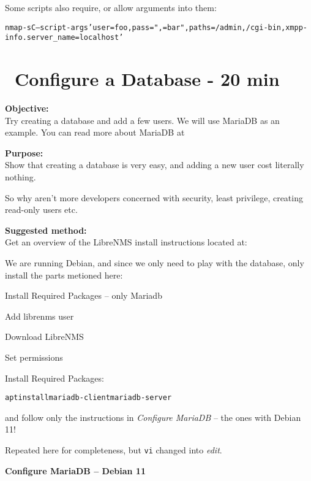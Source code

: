 \documentclass[a4paper,11pt,notitlepage]{report}
\begin{document}
Some scripts also require, or allow arguments into them:

\begin{alltt}
  nmap -sC --script-args 'user=foo,pass=",{}=bar",paths={/admin,/cgi-bin},xmpp-info.server_name=localhost'
\end{alltt}


\chapter{\faExclamationTriangle\ Configure a Database - 20 min}
\label{ex:mariadb-createdb}


{\bf Objective:}\\
Try creating a database and add a few users. We will use MariaDB as an example. You can read more about MariaDB at 


{\bf Purpose:}\\
Show that creating a database is very easy, and adding a new user cost literally nothing.

So why aren't more developers concerned with security, least privilege, creating read-only users etc.

{\bf Suggested method:}\\
Get an overview of the LibreNMS install instructions located at:\\

We are running Debian, and since we only need to play with the database, only install the parts metioned here:

\begin{list2}
\item Install Required Packages -- only Mariadb
\item Add librenms user
\item Download LibreNMS
\item Set permissions
\end{list2}

Install Required Packages:
\begin{alltt}
apt install mariadb-client mariadb-server
\end{alltt}

and follow only the instructions in \emph{Configure MariaDB} -- the ones with Debian 11!

Repeated here for completeness, but \verb+vi+ changed into \emph{edit}.

{\bf Configure MariaDB -- Debian 11}
\end{document}
